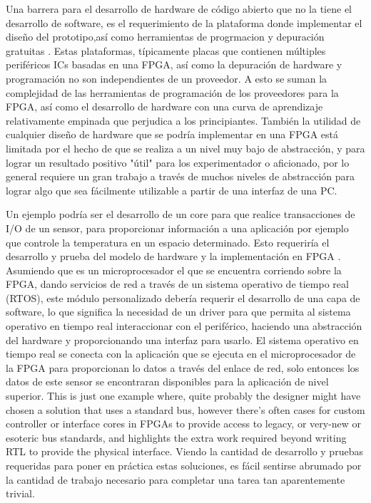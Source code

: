 Una barrera para el desarrollo de hardware de código abierto que no la tiene el desarrollo de software, es el requerimiento de la plataforma donde implementar el diseño del prototipo,así como herramientas  de progrmacion y depuración gratuitas . Estas plataformas, típicamente placas que contienen múltiples periféricos ICs basadas en una FPGA, así como la depuración de hardware y programación no son independientes de un proveedor. A esto se suman la complejidad de las herramientas de programación de los proveedores para la FPGA, así como el desarrollo de hardware con una curva de aprendizaje relativamente empinada que perjudica a los principiantes.
También  la utilidad de cualquier diseño de hardware que se podría implementar en una FPGA está limitada por el hecho de que se realiza a un nivel muy bajo de abstracción, y para lograr un resultado positivo "útil" para los experimentador o aficionado, por lo general requiere un gran trabajo a través de muchos niveles de abstracción para lograr algo que sea fácilmente utilizable a partir de una interfaz de una PC. 

Un ejemplo podría ser el desarrollo de un core para que realice transacciones de I/O de un sensor, para proporcionar información a una aplicación por ejemplo que controle la temperatura en un espacio determinado. Esto requeriría el desarrollo y prueba del modelo de hardware y la implementación en FPGA . Asumiendo que es un microprocesador el que se encuentra corriendo sobre la FPGA, dando servicios de red a través de un sistema operativo de tiempo real (RTOS), este módulo personalizado debería requerir el desarrollo de una capa de software, lo que significa la necesidad de un driver para que permita al sistema operativo en tiempo real interaccionar con el periférico, haciendo una abstracción del hardware y proporcionando una interfaz para usarlo. El sistema operativo en tiempo real se conecta con la aplicación que se ejecuta en el microprocesador de la FPGA para proporcionan lo datos a través del enlace de red, solo entonces los datos de este sensor se encontraran disponibles para la aplicación de nivel superior. This is just one example where, quite probably the designer might have chosen a solution that uses a standard bus, however there’s often cases for custom controller or interface cores in FPGAs to provide
access to legacy, or very-new or esoteric bus standards, and highlights the extra work required beyond writing RTL to provide the physical interface.
Viendo la cantidad de desarrollo y pruebas requeridas para poner en práctica estas soluciones, es fácil sentirse abrumado por la cantidad de trabajo necesario para completar una tarea tan aparentemente trivial.


